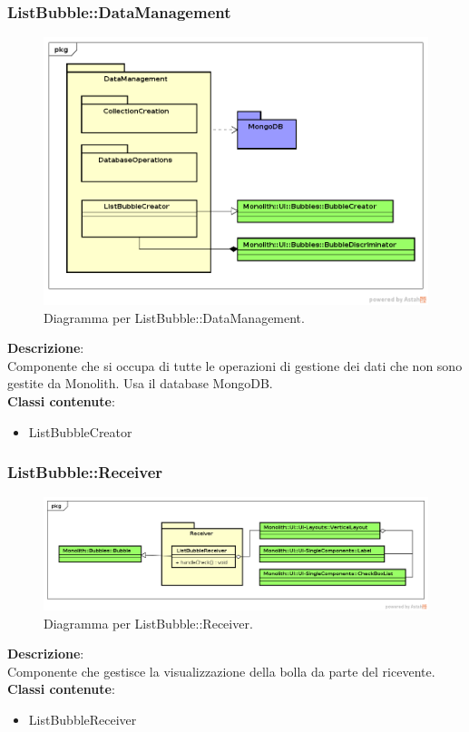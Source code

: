 \subsubsection{ListBubble::DataManagement}
   \FloatBarrier
   \begin{figure}[ht]
   \centering
\includegraphics[width=\textwidth,keepaspectratio]{img/listchecklistDatabase}
   \caption{Diagramma per ListBubble::DataManagement.}
\end{figure}
\FloatBarrier
\textbf{Descrizione}:\\
 Componente che si occupa di tutte le operazioni di gestione dei dati che non sono gestite da Monolith. Usa il database MongoDB. 
\\ \textbf{Classi contenute}:\\
\begin{itemize}
\item ListBubbleCreator
\end{itemize}


\clearpage

\subsubsection{ListBubble::Receiver}
   \FloatBarrier
   \begin{figure}[ht]
   \centering
\includegraphics[width=\textwidth,keepaspectratio]{img/listchecklistReceiver}
   \caption{Diagramma per ListBubble::Receiver.}
\end{figure}
\FloatBarrier
\textbf{Descrizione}:\\
 Componente che gestisce la visualizzazione della bolla da parte del ricevente. 
\\ \textbf{Classi contenute}:\\
\begin{itemize}
\item ListBubbleReceiver
\end{itemize}


